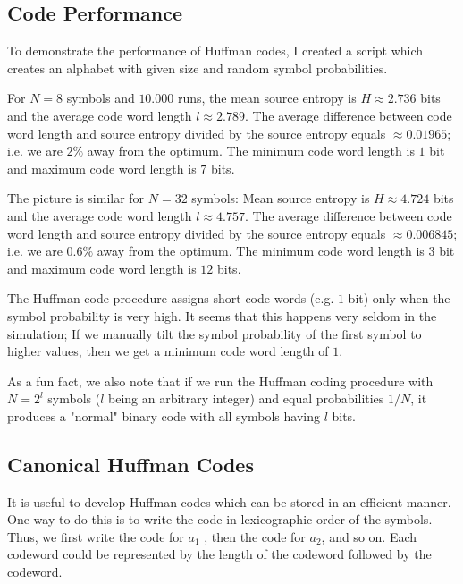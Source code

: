 
\subsection{Code Performance}

To demonstrate the performance of Huffman codes, I created a script which creates an alphabet with given size and random symbol probabilities. 

For $N = 8$ symbols and $10.000$ runs, the mean source entropy is $H \approx 2.736$ bits and the average code word length $l \approx 2.789$. The average difference between code word length and source entropy divided by the source entropy equals $\approx 0.01965$; i.e. we are $2\%$ away from the optimum. The minimum code word length is $1$ bit and maximum code word length is $7$ bits.

The picture is similar for $N = 32$ symbols: Mean source entropy is $H \approx 4.724$ bits and the average code word length $l \approx 4.757$. The average difference between code word length and source entropy divided by the source entropy equals $\approx 0.006845$; i.e. we are $0.6\%$ away from the optimum. The minimum code word length is $3$ bit and maximum code word length is $12$ bits.

The Huffman code procedure assigns short code words (e.g. $1$ bit) only when the symbol probability is very high. It seems that this happens very seldom in the simulation; If we manually tilt the symbol probability of the first symbol to higher values, then we get a minimum code word length of $1$.

As a fun fact, we also note that if we run the Huffman coding procedure with $N = 2^l$ symbols ($l$ being an arbitrary integer) and equal probabilities $1/N$, it produces a "normal" binary code with all symbols having $l$ bits.

\subsection{Canonical Huffman Codes}

It is useful to develop Huffman codes which can be stored in an efficient manner. One way to do this is to write the code in lexicographic order of the symbols. Thus, we first write the code for $a_1$ , then the code for $a_2$, and so on. Each codeword could be represented by the length of the codeword followed by the codeword. 

